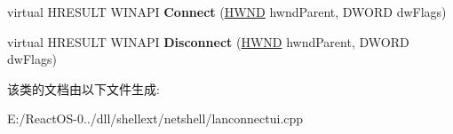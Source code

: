 \begin{DoxyCompactItemize}
\item 
\mbox{\label{class_c_net_connection_property_ui_a0a6c22913dbf43be5fb2819e2a427fd7}} 
virtual H\+R\+E\+S\+U\+LT W\+I\+N\+A\+PI {\bfseries Connect} (\hyperlink{interfacevoid}{H\+W\+ND} hwnd\+Parent, D\+W\+O\+RD dw\+Flags)
\item 
\mbox{\label{class_c_net_connection_property_ui_ab33041075c25f4b7af06a257aeddc8de}} 
virtual H\+R\+E\+S\+U\+LT W\+I\+N\+A\+PI {\bfseries Disconnect} (\hyperlink{interfacevoid}{H\+W\+ND} hwnd\+Parent, D\+W\+O\+RD dw\+Flags)
\end{DoxyCompactItemize}


该类的文档由以下文件生成\+:\begin{DoxyCompactItemize}
\item 
E\+:/\+React\+O\+S-\/0../dll/shellext/netshell/lanconnectui.\+cpp\end{DoxyCompactItemize}
